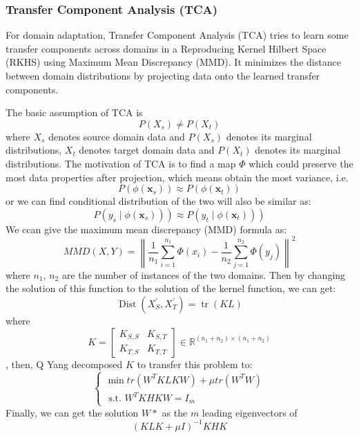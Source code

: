 \documentclass[conference]{IEEEtran}
\begin{document}
\subsubsection{Transfer Component Analysis (TCA)}

For domain adaptation, Transfer Component Analysis (TCA) \cite{Sinno2011Domain} tries to learn some transfer components across domains in a Reproducing Kernel Hilbert Space (RKHS) using Maximum Mean Discrepancy (MMD). It minimizes the distance between domain distributions by projecting data onto the learned transfer components.

The basic assumption of TCA is 
$$P\left(X_{s}\right) \neq P\left(X_{t}\right)$$
where $X_{s}$ denotes source domain data and $P\left(X_{s}\right)$ denotes its marginal distributions, $X_{t}$ denotes target domain data and $P\left(X_{t}\right)$ denotes its marginal distributions. The motivation of TCA is to find a map $\Phi$ which could preserve the most data properties after projection, which means obtain the most variance, i.e.
$$P\left(\phi\left(\mathbf{x}_{s}\right)\right) \approx P\left(\phi\left(\mathbf{x}_{t}\right)\right)$$
or we can find conditional distribution of the two will also be similar as:
$$
\left.\left.P\left(y_{s} \mid \phi\left(\mathbf{x}_{s}\right)\right)\right) \approx P\left(y_{t} \mid \phi\left(\mathbf{x}_{t}\right)\right)\right)
$$
We ccan give the maximum mean discrepancy (MMD) formula as:
$$
M M D(X, Y)=\left\|\frac{1}{n_{1}} \sum_{i=1}^{n_{1}} \Phi\left(x_{i}\right)-\frac{1}{n_{2}} \sum_{j=1}^{n_{2}} \Phi\left(y_{j}\right)\right\|^{2}
$$
where $n_1$, $n_2$ are the number of instances of the two domains. Then by changing the solution of this function to the solution of the kernel function, we can get: 
$$
\operatorname{Dist}\left(X_{S}^{\prime}, X_{T}^{\prime}\right)=\operatorname{tr}(K L)
$$
where
$$
K=\left[\begin{array}{ll}
K_{S, S} & K_{S, T} \\
K_{T, S} & K_{T, T}
\end{array}\right] \in \mathbb{R}^{\left(n_{1}+n_{2}\right) \times\left(n_{1}+n_{2}\right)}
$$,
then, Q Yang\cite{Sinno2011Domain} decomposed $K$ to transfer this problem to:
$$
\left\{\begin{array}{l}
\min t r\left(W^{T} K L K W\right)+\mu t r\left(W^{T} W\right) \\
\text { s.t. } W^{T} K H K W=I_{m}
\end{array}\right.
$$
Finally, we can get the solution $W*$ as the $m$ leading eigenvectors of
$$
(K L K+\mu I)^{-1} K H K
$$
\end{document}
